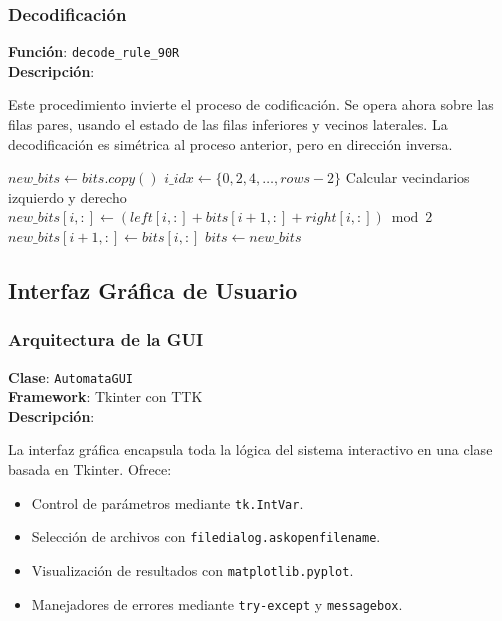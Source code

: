 \subsubsection{Decodificaci\'on}
\textbf{Funci\'on}: \texttt{decode\_rule\_90R}\\
\textbf{Descripci\'on}:

Este procedimiento invierte el proceso de codificaci\'on. Se opera ahora sobre las filas pares, usando el estado de las filas inferiores y vecinos laterales. La decodificaci\'on es sim\'etrica al proceso anterior, pero en direcci\'on inversa.

\begin{algorithm}[H]
\caption{Algoritmo de Decodificaci\'on Regla 90R}
\begin{algorithmic}[1]
\STATE $new\_bits \gets bits.copy()$
\STATE $i\_idx \gets \{0, 2, 4, \ldots, rows-2\}$ 
\STATE Calcular vecindarios izquierdo y derecho
\STATE $new\_bits[i, :] \gets (left[i, :] + bits[i+1, :] + right[i, :]) \bmod 2$
\STATE $new\_bits[i+1, :] \gets bits[i, :]$
\ENDFOR
\STATE $bits \gets new\_bits$
\ENDFOR
\end{algorithmic}
\end{algorithm}

\subsection{Interfaz Gr\'afica de Usuario}
\subsubsection{Arquitectura de la GUI}
\textbf{Clase}: \texttt{AutomataGUI}\\
\textbf{Framework}: Tkinter con TTK\\
\textbf{Descripci\'on}:

La interfaz gr\'afica encapsula toda la l\'ogica del sistema interactivo en una clase basada en Tkinter. Ofrece:
\begin{itemize}
\item Control de par\'ametros mediante \texttt{tk.IntVar}.
\item Selecci\'on de archivos con \texttt{filedialog.askopenfilename}.
\item Visualizaci\'on de resultados con \texttt{matplotlib.pyplot}.
\item Manejadores de errores mediante \texttt{try-except} y \texttt{messagebox}.
\end{itemize}

